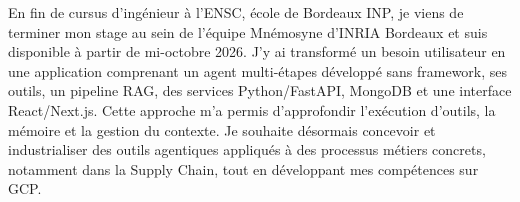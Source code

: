 
\begin{cvparagraph}
En fin de cursus d’ingénieur à l’ENSC, école de Bordeaux INP, je viens de terminer mon stage au sein de l’équipe Mnémosyne d’INRIA Bordeaux et suis disponible à partir de mi-octobre 2026. J’y ai transformé un besoin utilisateur en une application comprenant un agent multi-étapes développé sans framework, ses outils, un pipeline RAG, des services Python/FastAPI, MongoDB et une interface React/Next.js. Cette approche m’a permis d’approfondir l’exécution d’outils, la mémoire et la gestion du contexte. Je souhaite désormais concevoir et industrialiser des outils agentiques appliqués à des processus métiers concrets, notamment dans la Supply Chain, tout en développant mes compétences sur GCP.
\end{cvparagraph}
